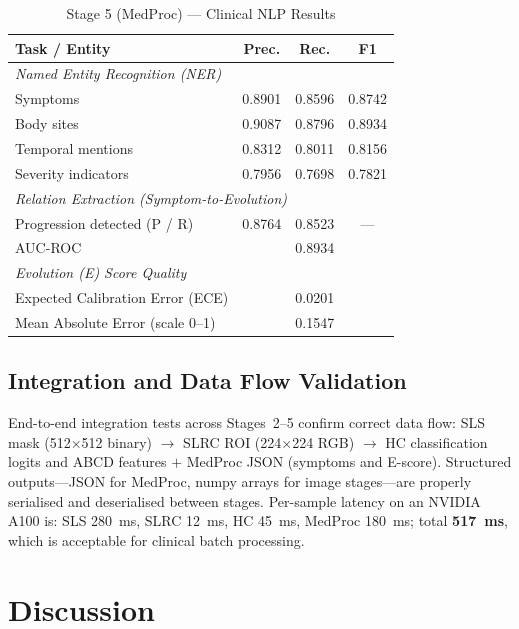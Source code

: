 \documentclass[conference]{IEEEtran}
\begin{document}
\begin{table}[h]
\centering
\small
\renewcommand{\arraystretch}{1.2}
\caption{Stage 5 (MedProc) --- Clinical NLP Results}
\label{tab:medproc_results}
\setlength{\tabcolsep}{4pt}
\begin{tabular}{l c c c}
\toprule
\textbf{Task / Entity} & \textbf{Prec.} & \textbf{Rec.} & \textbf{F1} \\
\midrule
\multicolumn{4}{l}{\textit{Named Entity Recognition (NER)}} \\
\midrule
Symptoms            & 0.8901 & 0.8596 & 0.8742 \\
Body sites          & 0.9087 & 0.8796 & 0.8934 \\
Temporal mentions   & 0.8312 & 0.8011 & 0.8156 \\
Severity indicators & 0.7956 & 0.7698 & 0.7821 \\
\midrule
\multicolumn{4}{l}{\textit{Relation Extraction (Symptom-to-Evolution)}} \\
\midrule
Progression detected (P / R) & 0.8764 & 0.8523 & --- \\
AUC-ROC              & \multicolumn{3}{c}{0.8934} \\
\midrule
\multicolumn{4}{l}{\textit{Evolution (E) Score Quality}} \\
\midrule
Expected Calibration Error (ECE) & \multicolumn{3}{c}{0.0201} \\
Mean Absolute Error (scale 0--1) & \multicolumn{3}{c}{0.1547} \\
\bottomrule
\end{tabular}
\end{table}

\subsection{Integration and Data Flow Validation}

End-to-end integration tests across Stages~2--5 confirm correct data
flow: SLS mask (512$\times$512 binary) $\to$ SLRC ROI
(224$\times$224 RGB) $\to$ HC classification logits and ABCD features
$+$ MedProc JSON (symptoms and E-score). Structured outputs---JSON for
MedProc, numpy arrays for image stages---are properly serialised and
deserialised between stages. Per-sample latency on an NVIDIA A100 is:
SLS 280~ms, SLRC 12~ms, HC 45~ms, MedProc 180~ms; total
\textbf{517~ms}, which is acceptable for clinical batch processing.

\section{Discussion}
\end{document}
